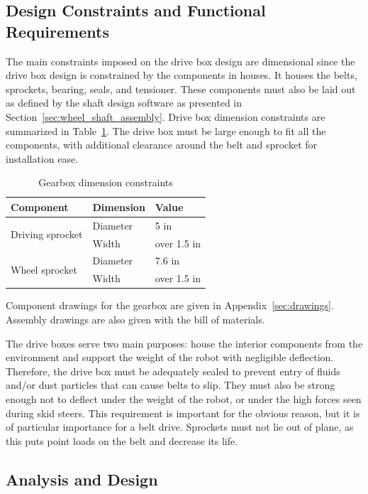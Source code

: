 \subsection{Design Constraints and Functional Requirements}

The main constraints imposed on the drive box design are dimensional since the drive box design is constrained by the components in houses. It houses the belts, sprockets, bearing, seals, and tensioner. These components must also be laid out as defined by the shaft design software as presented in Section~\ref{sec:wheel_shaft_assembly}. Drive box dimension constraints are summarized in Table~\ref{tab:box_dim}. The drive box must be large enough to fit all the components, with additional clearance around the belt and sprocket for installation ease.

\begin{table}[htbp]
\centering
\caption{Gearbox dimension constraints}
\begin{tabular}{| lll |}\hline
Component & Dimension & Value \\ \hline
\multirow{2}{*}{Driving sprocket} & Diameter & 5  in \\
& Width & over 1.5 in \\
\multirow{2}{*}{Wheel sprocket} & Diameter & 7.6  in \\
& Width & over 1.5 in \\ \hline
\end{tabular}
\label{tab:box_dim}
\end{table}

Component drawings for the gearbox are given in Appendix~\ref{sec:drawings}. Assembly drawings are also given with the bill of materials.

The drive boxes serve two main purposes: house the interior components from the environment and support the weight of the robot with negligible deflection. Therefore, the drive box must be adequately sealed to prevent entry of fluids and/or dust particles that can cause belts to slip. They must also be strong enough not to deflect under the weight of the robot, or under the high forces seen during skid steers. This requirement is important for the obvious reason, but it is of particular importance for a belt drive. Sprockets must not lie out of plane, as this puts point loads on the belt and decrease its life.

\subsection{Analysis and Design}

